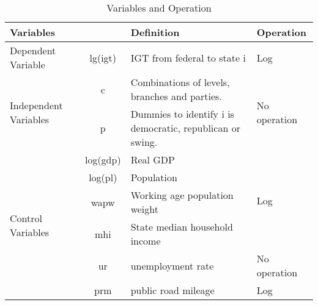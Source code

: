 \begin{table}[htbp]
    \centering
    \caption{Variables and Operation}
    \begin{tabular}{lcp{12.715em}p{6.145em}}
        \toprule
        \multicolumn{2}{p{9.93em}}{Variables }                        & Definition & Operation                                                                                    \\
        \midrule
        \multicolumn{1}{p{4.715em}}{Dependent Variable}               & lg(igt)    & IGT from federal to state i                               & Log                              \\
        \midrule
        \multicolumn{1}{l}{\multirow{2}[4]{*}{Independent Variables}} & c          & Combinations of levels, branches and parties.             & \multirow{2}[4]{*}{No operation} \\
        \cmidrule{2-3}                                                & p          & Dummies to identify i is democratic, republican or swing. & \multicolumn{1}{c}{}             \\
        \midrule
        \multicolumn{1}{l}{\multirow{6}[12]{*}{Control Variables}}    & log(gdp)   & \multicolumn{1}{l}{Real GDP}                              & \multirow{4}[8]{*}{Log }         \\
        \cmidrule{2-3}                                                & log(pl)    & \multicolumn{1}{l}{Population }                           & \multicolumn{1}{c}{}             \\
        \cmidrule{2-3}                                                & wapw       & Working age population weight                             & \multicolumn{1}{c}{}             \\
        \cmidrule{2-3}                                                & mhi        & State median household income                             & \multicolumn{1}{c}{}             \\
        \cmidrule{2-4}                                                & ur         & unemployment rate                                         & No operation                     \\
        \cmidrule{2-4}                                                & prm        & public road mileage                                       & Log                              \\
        \bottomrule
    \end{tabular}%
    \label{Table 2.5}%
\end{table}%

